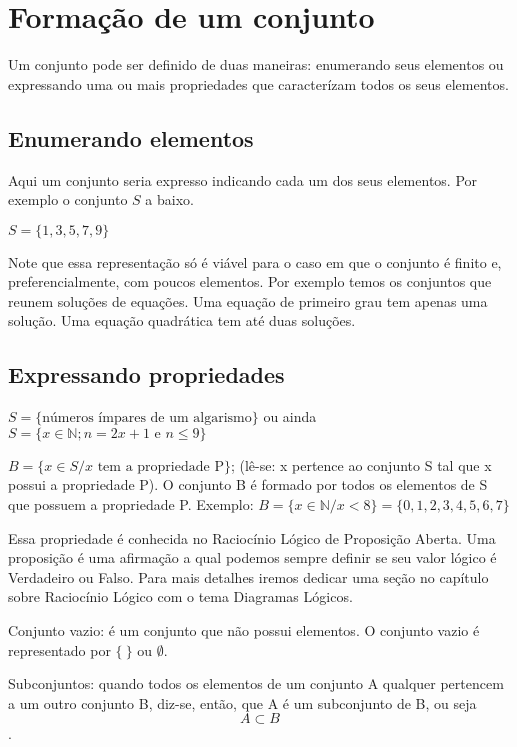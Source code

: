 \section{Formação de um conjunto}
Um conjunto pode ser definido de duas maneiras: enumerando seus elementos ou expressando uma ou mais propriedades que caracterízam todos os seus elementos.


\subsection{Enumerando elementos}
Aqui um conjunto seria expresso indicando cada um dos seus elementos. Por exemplo o conjunto $S$ a baixo.

 $S = \{1, 3, 5, 7, 9\}$
 
 Note que essa representação só é viável para o caso em que o conjunto é finito e, preferencialmente, com poucos elementos. Por exemplo temos os conjuntos que reunem soluções de equações. Uma equação de primeiro grau tem apenas uma solução. Uma equação quadrática tem até duas soluções.

\subsection{Expressando propriedades}

$S = \{\mbox{números ímpares de um algarismo}\}$ ou ainda
$S=\{x\in \mathbb{N};n=2x+1\mbox{ e } n\leq 9\}$

$B = \{x \in S / x \mbox{ tem a propriedade P}\}$; (lê-se: x pertence ao conjunto S tal que x possui a propriedade P).
O conjunto B é formado por todos os elementos de S que possuem a propriedade P.
Exemplo: $B = \{x \in \mathbb{N} / x < 8\} = \{0, 1, 2, 3, 4, 5, 6, 7\}$

Essa propriedade é conhecida no Raciocínio Lógico de Proposição Aberta. Uma proposição é uma afirmação a qual podemos sempre definir se seu valor lógico é Verdadeiro ou Falso. Para mais detalhes iremos dedicar uma seção no capítulo sobre Raciocínio Lógico com o tema Diagramas Lógicos.


\begin{defi}
Conjunto vazio: é um conjunto que não possui elementos. O conjunto vazio é representado por $\{ \ \}$ ou $\emptyset$.
\end{defi}

\begin{defi}
Subconjuntos: quando todos os elementos de um conjunto A qualquer pertencem a um outro conjunto B, diz-se, então, que A é um subconjunto de B, ou seja $$A\subset B$$.
\end{defi}

